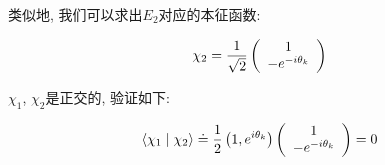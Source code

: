 \begin{enumerate}
类似地, 我们可以求出$E_2$对应的本征函数:

\begin{equation*}
\chi_2 =\frac{1}{\sqrt 2} \left( {\begin{array}{*{20}c}
   {1}  \\
   { - e^{-i \theta_k}}  \\
 \end{array} } \right)
\end{equation*}

$\chi_1$, $\chi_2$是正交的, 验证如下:

\begin{equation*}
\left\langle \chi_1 \mid \chi_2 \right\rangle \doteq \frac{1}{2}
\left( 1, e^{i \theta_k} \right) \left( {\begin{array}{*{20}c}
   {1}  \\
   {- e^{- i \theta_k}}  \\
\end{array} } \right) = 0
\end{equation*}

\end{enumerate}